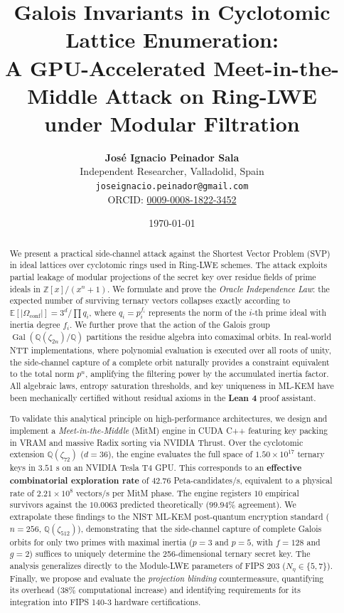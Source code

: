 \documentclass[11pt,a4paper]{article}
\title{\bfseries Galois Invariants in Cyclotomic Lattice Enumeration:\\[4pt]
       \large A GPU-Accelerated Meet-in-the-Middle Attack on Ring-LWE\\[2pt]
       \large under Modular Filtration}
\author{%
    \textbf{José Ignacio Peinador Sala}\\[4pt]
    \small Independent Researcher, Valladolid, Spain\\
    \small \texttt{joseignacio.peinador@gmail.com}\\
    \small ORCID: \href{https://orcid.org/0009-0008-1822-3452}{0009-0008-1822-3452}
}
\date{\today}
\theoremstyle{plain}
\theoremstyle{definition}
\numberwithin{equation}{section}
\newcommand{\QQ}{\mathbb{Q}}
\newcommand{\ZZ}{\mathbb{Z}}
\newcommand{\Gal}{\operatorname{Gal}}
\newcommand{\E}{\mathbb{E}}
\begin{document}
\maketitle

\begin{abstract}
We present a practical side-channel attack against the Shortest Vector Problem (SVP) in ideal lattices over cyclotomic rings used in Ring-LWE schemes. The attack exploits partial leakage of modular projections of the secret key over residue fields of prime ideals in $\ZZ[x]/(x^n+1)$. We formulate and prove the \emph{Oracle Independence Law}: the expected number of surviving ternary vectors collapses exactly according to $\E[|\Omega_{\text{conf}}|] = 3^d / \prod q_i$, where $q_i = p_i^{f_i}$ represents the norm of the $i$-th prime ideal with inertia degree $f_i$. We further prove that the action of the Galois group $\Gal(\QQ(\zeta_{2n})/\QQ)$ partitions the residue algebra into comaximal orbits. In real-world NTT implementations, where polynomial evaluation is executed over all roots of unity, the side-channel capture of a complete orbit naturally provides a constraint equivalent to the total norm $p^n$, amplifying the filtering power by the accumulated inertia factor. All algebraic laws, entropy saturation thresholds, and key uniqueness in ML-KEM have been mechanically certified without residual axioms in the \textbf{Lean 4} proof assistant.

To validate this analytical principle on high-performance architectures, we design and implement a \emph{Meet-in-the-Middle} (MitM) engine in CUDA C++ featuring key packing in VRAM and massive Radix sorting via NVIDIA Thrust. Over the cyclotomic extension $\QQ(\zeta_{72})$ ($d=36$), the engine evaluates the full space of $1.50 \times 10^{17}$ ternary keys in $3.51\text{ s}$ on an NVIDIA Tesla T4 GPU. This corresponds to an \textbf{effective combinatorial exploration rate} of $42.76$ Peta-candidates/s, equivalent to a physical rate of $2.21 \times 10^8$ vectors/s per MitM phase. The engine registers $10$ empirical survivors against the $10.0063$ predicted theoretically ($99.94\%$ agreement). We extrapolate these findings to the NIST ML-KEM post-quantum encryption standard ($n=256$, $\QQ(\zeta_{512})$), demonstrating that the side-channel capture of complete Galois orbits for only two primes with maximal inertia ($p=3$ and $p=5$, with $f=128$ and $g=2$) suffices to uniquely determine the 256-dimensional ternary secret key. The analysis generalizes directly to the Module-LWE parameters of FIPS 203 ($N_\eta \in \{5, 7\}$). Finally, we propose and evaluate the \emph{projection blinding} countermeasure, quantifying its overhead ($38\%$ computational increase) and identifying requirements for its integration into FIPS 140-3 hardware certifications.
\end{abstract}
\end{document}
